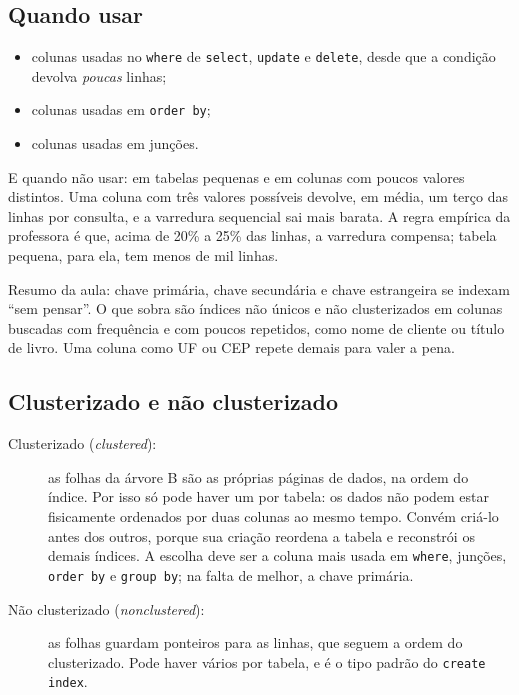 \subsection{Quando usar}

\begin{itemize}
	\item colunas usadas no \texttt{where} de \texttt{select},
	\texttt{update} e \texttt{delete}, desde que a condição devolva
	\emph{poucas} linhas;
	\item colunas usadas em \texttt{order by};
	\item colunas usadas em junções.
\end{itemize}

E quando não usar: em tabelas pequenas e em colunas com poucos valores
distintos. Uma coluna com três valores possíveis devolve, em média, um
terço das linhas por consulta, e a varredura sequencial sai mais barata.
A regra empírica da professora é que, acima de 20\% a 25\% das linhas, a
varredura compensa; tabela pequena, para ela, tem menos de mil linhas.

Resumo da aula: chave primária, chave secundária e chave estrangeira se
indexam ``sem pensar''. O que sobra são índices não únicos e não
clusterizados em colunas buscadas com frequência e com poucos repetidos,
como nome de cliente ou título de livro. Uma coluna como UF ou CEP
repete demais para valer a pena.

\subsection{Clusterizado e não clusterizado}

\begin{description}
	\item[Clusterizado (\emph{clustered}):] as
	folhas da árvore B são as próprias páginas de dados, na ordem do
	índice. Por isso só pode haver um por tabela: os dados não podem estar
	fisicamente ordenados por duas colunas ao mesmo tempo. Convém criá-lo
	antes dos outros, porque sua criação reordena a tabela e reconstrói os
	demais índices. A escolha deve ser a coluna mais usada em
	\texttt{where}, junções, \texttt{order by} e \texttt{group by}; na
	falta de melhor, a chave primária.
	\item[Não clusterizado (\emph{nonclustered}):] as folhas guardam
	ponteiros para as linhas, que seguem a ordem do clusterizado. Pode
	haver vários por tabela, e é o tipo padrão do \texttt{create index}.
\end{description}

